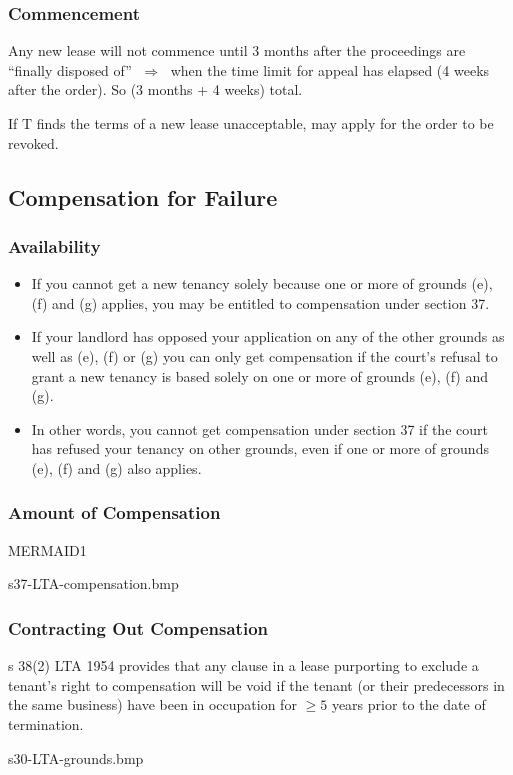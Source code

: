 \documentclass[
]{article}
\providecommand{\tightlist}{%
  \setlength{\itemsep}{0pt}\setlength{\parskip}{0pt}}
\begin{document}
\hypertarget{commencement-1}{%
\subsubsection{Commencement}\label{commencement-1}}

Any new lease will not commence until 3 months after the proceedings are
``finally disposed of'' {\(\;\Longrightarrow\;\)} when the time limit
for appeal has elapsed (4 weeks after the order). So (3 months + 4
weeks) total.

If T finds the terms of a new lease unacceptable, may apply for the
order to be revoked.

\hypertarget{compensation-for-failure}{%
\subsection{Compensation for Failure}\label{compensation-for-failure}}

\hypertarget{availability}{%
\subsubsection{Availability}\label{availability}}

\begin{itemize}
\tightlist
\item
  If you cannot get a new tenancy solely because one or more of grounds
  (e), (f) and (g) applies, you may be entitled to compensation under
  section 37.
\item
  If your landlord has opposed your application on any of the other
  grounds as well as (e), (f) or (g) you can only get compensation if
  the court's refusal to grant a new tenancy is based solely on one or
  more of grounds (e), (f) and (g).
\item
  In other words, you cannot get compensation under section 37 if the
  court has refused your tenancy on other grounds, even if one or more
  of grounds (e), (f) and (g) also applies.
\end{itemize}

\hypertarget{amount-of-compensation}{%
\subsubsection{Amount of Compensation}\label{amount-of-compensation}}

MERMAID1

s37-LTA-compensation.bmp

\hypertarget{contracting-out-compensation}{%
\subsubsection{Contracting Out
Compensation}\label{contracting-out-compensation}}

s 38(2) LTA 1954 provides that any clause in a lease purporting to
exclude a tenant's right to compensation will be void if the tenant (or
their predecessors in the same business) have been in occupation for
{\(\geq 5\)} years prior to the date of termination.

s30-LTA-grounds.bmp
\end{document}
